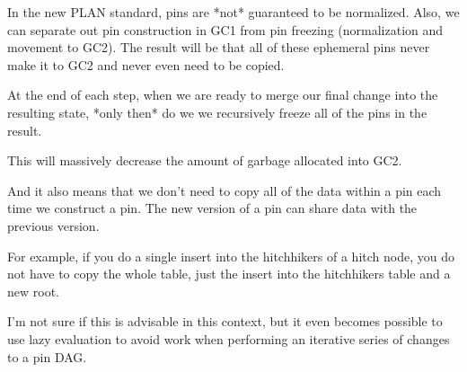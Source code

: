 In the new PLAN standard, pins are *not* guaranteed to be normalized.
Also, we can separate out pin construction in GC1 from pin freezing
(normalization and movement to GC2).  The result will be that all of these
ephemeral pins never make it to GC2 and never even need to be copied.

At the end of each step, when we are ready to merge our final change
into the resulting state, *only then* do we we recursively freeze all of
the pins in the result.

This will massively decrease the amount of garbage allocated into GC2.

And it also means that we don't need to copy all of the data within a
pin each time we construct a pin.  The new version of a pin can share
data with the previous version.

For example, if you do a single insert into the hitchhikers of a hitch
node, you do not have to copy the whole table, just the insert into the
hitchhikers table and a new root.

I'm not sure if this is advisable in this context, but it even becomes
possible to use lazy evaluation to avoid work when performing an
iterative series of changes to a pin DAG.



